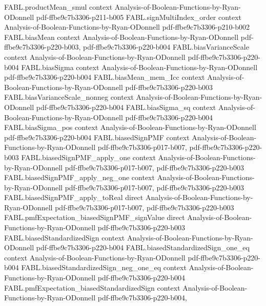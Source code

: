 \begin{theorem}
  {FABL.productMean_smul}
  {context}
  {Analysis-of-Boolean-Functions-by-Ryan-ODonnell}
  {pdf-ffbe9c7b3306-p211-b005}
\proofstep
  {FABL.signMultiIndex_order}
  {context}
  {Analysis-of-Boolean-Functions-by-Ryan-ODonnell}
  {pdf-ffbe9c7b3306-p210-b002}
\proofstep
  {FABL.biasMean}
  {context}
  {Analysis-of-Boolean-Functions-by-Ryan-ODonnell}
  {pdf-ffbe9c7b3306-p220-b003,
    pdf-ffbe9c7b3306-p220-b004}
\proofstep
  {FABL.biasVarianceScale}
  {context}
  {Analysis-of-Boolean-Functions-by-Ryan-ODonnell}
  {pdf-ffbe9c7b3306-p220-b004}
\proofstep
  {FABL.biasSigma}
  {context}
  {Analysis-of-Boolean-Functions-by-Ryan-ODonnell}
  {pdf-ffbe9c7b3306-p220-b004}
\proofstep
  {FABL.biasMean_mem_Icc}
  {context}
  {Analysis-of-Boolean-Functions-by-Ryan-ODonnell}
  {pdf-ffbe9c7b3306-p220-b003}
\proofstep
  {FABL.biasVarianceScale_nonneg}
  {context}
  {Analysis-of-Boolean-Functions-by-Ryan-ODonnell}
  {pdf-ffbe9c7b3306-p220-b004}
\proofstep
  {FABL.biasSigma_sq}
  {context}
  {Analysis-of-Boolean-Functions-by-Ryan-ODonnell}
  {pdf-ffbe9c7b3306-p220-b004}
\proofstep
  {FABL.biasSigma_pos}
  {context}
  {Analysis-of-Boolean-Functions-by-Ryan-ODonnell}
  {pdf-ffbe9c7b3306-p220-b004}
\proofstep
  {FABL.biasedSignPMF}
  {context}
  {Analysis-of-Boolean-Functions-by-Ryan-ODonnell}
  {pdf-ffbe9c7b3306-p017-b007,
    pdf-ffbe9c7b3306-p220-b003}
\proofstep
  {FABL.biasedSignPMF_apply_one}
  {context}
  {Analysis-of-Boolean-Functions-by-Ryan-ODonnell}
  {pdf-ffbe9c7b3306-p017-b007,
    pdf-ffbe9c7b3306-p220-b003}
\proofstep
  {FABL.biasedSignPMF_apply_neg_one}
  {context}
  {Analysis-of-Boolean-Functions-by-Ryan-ODonnell}
  {pdf-ffbe9c7b3306-p017-b007,
    pdf-ffbe9c7b3306-p220-b003}
\proofstep
  {FABL.biasedSignPMF_apply_toReal}
  {direct}
  {Analysis-of-Boolean-Functions-by-Ryan-ODonnell}
  {pdf-ffbe9c7b3306-p017-b007,
    pdf-ffbe9c7b3306-p220-b003}
\proofstep
  {FABL.pmfExpectation_biasedSignPMF_signValue}
  {direct}
  {Analysis-of-Boolean-Functions-by-Ryan-ODonnell}
  {pdf-ffbe9c7b3306-p220-b003}
\proofstep
  {FABL.biasedStandardizedSign}
  {context}
  {Analysis-of-Boolean-Functions-by-Ryan-ODonnell}
  {pdf-ffbe9c7b3306-p220-b004}
\proofstep
  {FABL.biasedStandardizedSign_one_eq}
  {context}
  {Analysis-of-Boolean-Functions-by-Ryan-ODonnell}
  {pdf-ffbe9c7b3306-p220-b004}
\proofstep
  {FABL.biasedStandardizedSign_neg_one_eq}
  {context}
  {Analysis-of-Boolean-Functions-by-Ryan-ODonnell}
  {pdf-ffbe9c7b3306-p220-b004}
\proofstep
  {FABL.pmfExpectation_biasedStandardizedSign}
  {context}
  {Analysis-of-Boolean-Functions-by-Ryan-ODonnell}
  {pdf-ffbe9c7b3306-p220-b004,
}
\end{theorem}
